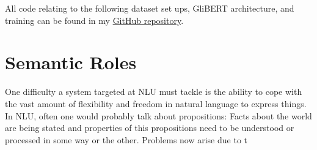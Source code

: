 All code relating to the following dataset set ups, GliBERT architecture, and training can be found in
my \href{https://github.com/JonathanSchaber/Masterarbeit}{GitHub repository}.


\section{Semantic Roles}



One difficulty a system targeted at NLU must tackle is the ability to cope with the vast amount of
flexibility and freedom in natural language to express things. In NLU, often one would probably
talk about propositions: Facts about the world are being stated and properties of this propositions
need to be understood or processed in some way or the other.
{\color{red} Problems now arise due to t}

